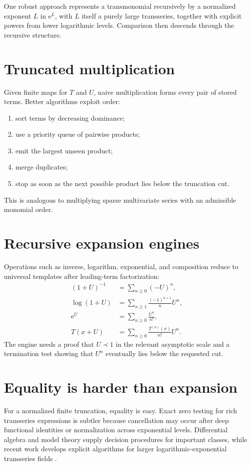 \documentclass[11pt,oneside]{book}
\theoremstyle{definition}
\theoremstyle{remark}
\newcommand{\e}{\mathrm{e}}
\newcommand{\precdom}{\prec}
\begin{document}
One robust approach represents a transmonomial recursively by a normalized
exponent $L$ in $\e^L$, with $L$ itself a purely large transseries, together with
explicit powers from lower logarithmic levels. Comparison then descends through
the recursive structure.

\section{Truncated multiplication}

Given finite maps for $T$ and $U$, naive multiplication forms every pair of
stored terms. Better algorithms exploit order:
\begin{enumerate}
\item sort terms by decreasing dominance;
\item use a priority queue of pairwise products;
\item emit the largest unseen product;
\item merge duplicates;
\item stop as soon as the next possible product lies below the truncation cut.
\end{enumerate}
This is analogous to multiplying sparse multivariate series with an admissible
monomial order.

\section{Recursive expansion engines}

Operations such as inverse, logarithm, exponential, and composition reduce to
universal templates after leading-term factorization:
\begin{align*}
  (1+U)^{-1}&=\sum_{n\ge0}(-U)^n,\\
  \log(1+U)&=\sum_{n\ge1}\frac{(-1)^{n+1}}nU^n,\\
  \e^U&=\sum_{n\ge0}\frac{U^n}{n!},\\
  T(x+U)&=\sum_{n\ge0}\frac{T^{(n)}(x)}{n!}U^n.
\end{align*}
The engine needs a proof that $U\precdom1$ in the relevant asymptotic scale and
a termination test showing that $U^n$ eventually lies below the requested cut.

\section{Equality is harder than expansion}

For a normalized finite truncation, equality is easy. Exact zero testing for rich
transseries expressions is subtler because cancellation may occur after deep
functional identities or normalization across exponential levels. Differential
algebra and model theory supply decision procedures for important classes, while
recent work develops explicit algorithms for larger logarithmic-exponential
transseries fields \cite{ChenFangHoeven2026}.
\end{document}
